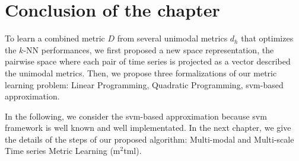 \newpage
\section{Conclusion of the chapter}
To learn a combined metric $D$ from several unimodal metrics $d_h$ that optimizes the $k$-NN performances, we first proposed a new space representation, the pairwise space where each pair of time series is projected as a vector described the unimodal metrics. Then, we propose three formalizations of our metric learning problem: Linear Programming, Quadratic Programming, {\sc svm}-based approximation.

In the following, we consider the {\sc svm}-based approximation because {\sc svm} framework is well known and well implementated. In the next chapter, we give the details of the steps of our proposed algorithm: Multi-modal and Multi-scale Time series Metric Learning ({\sc m}$^2${\sc tml}).
